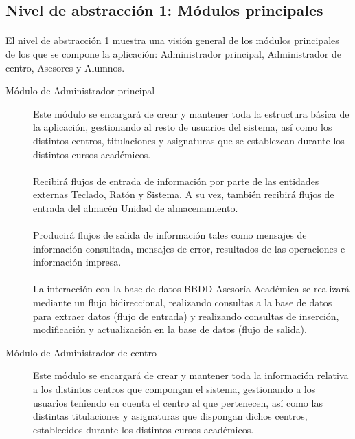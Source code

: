 \subsection{Nivel de abstracción 1: Módulos principales}

  \paragraph{}El nivel de abstracción 1 muestra una visión general de los
  módulos principales de los que se compone la aplicación: Administrador
  principal, Administrador de centro, Asesores y Alumnos.

  \begin{description}
   \item[Módulo de Administrador principal] Este módulo se encargará de
   crear y mantener toda la estructura básica de la aplicación, gestionando
   al resto de usuarios del sistema, así como los distintos centros,
   titulaciones y asignaturas que se establezcan durante los distintos cursos
   académicos.

   \paragraph{}Recibirá flujos de entrada de información por parte de las
   entidades externas Teclado, Ratón y Sistema. A su vez, también recibirá
   flujos de entrada del almacén Unidad de almacenamiento.

   \paragraph{}Producirá flujos de salida de información tales como mensajes de
   información consultada, mensajes de error, resultados de las operaciones e
   información impresa.

   \paragraph{}La interacción con la base de datos BBDD Asesoría Académica se
   realizará mediante un flujo bidireccional, realizando consultas a la base de
   datos para extraer datos (flujo de entrada) y realizando consultas de
   inserción, modificación y actualización en la base de datos (flujo de
   salida).

   \item[Módulo de Administrador de centro] Este módulo se encargará de
   crear y mantener toda la información relativa a los distintos centros
   que compongan el sistema, gestionando a los usuarios teniendo en cuenta el
   centro al que pertenecen, así como las distintas titulaciones y asignaturas
   que dispongan dichos centros, establecidos durante los distintos cursos
   académicos.


\end{description}
